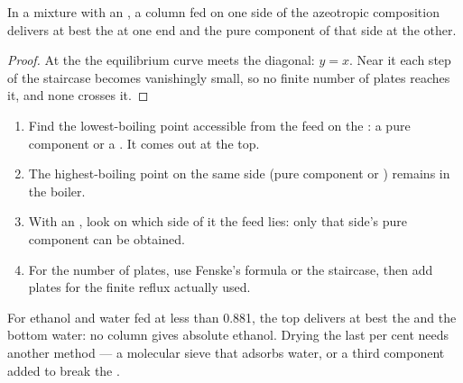 \begin{proposition}\label{prop:b2:liquid-vapour-diagrams:azeotrope-limit}
In a mixture with an , a column fed on one side of the azeotropic
composition delivers at best the  at one end and the pure component
of that side at the other.
\end{proposition}

\begin{proof}
At the  the equilibrium curve meets the diagonal: $y = x$. Near it
each step of the staircase becomes vanishingly small, so no finite number of
plates reaches it, and none crosses it.
\end{proof}

\begin{method}\label{met:b2:liquid-vapour-diagrams:predict-distillation}
\begin{enumerate}
  \item Find the lowest-boiling point accessible from the feed on the
        : a pure component or a . It comes
        out at the top.
  \item The highest-boiling point on the same side (pure component or
        ) remains in the boiler.
  \item With an , look on which side of it the feed lies: only that
        side's pure component can be obtained.
  \item For the number of plates, use Fenske's formula or the staircase,
        then add plates for the finite reflux actually used.
\end{enumerate}
\end{method}

For ethanol and water fed at less than 0.881, the top delivers at best the
 and the bottom water: no column gives absolute ethanol. Drying the
last per cent needs another method --- a molecular sieve that adsorbs water, or
a third component added to break the .

